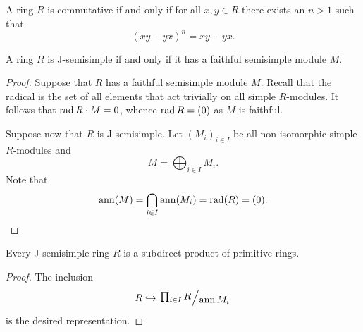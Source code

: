 \begin{izrek}
A ring $R$ is commutative if and only if for all $x, y \in R$
there exists an $n > 1$ such that
\[
(xy - yx)^n = xy - yx.
\]
\end{izrek}

\begin{trditev}
A ring $R$ is J-semisimple if and only if it has a faithful
semisimple module $M$.
\end{trditev}

\begin{proof}
Suppose that $R$ has a faithful semisimple module $M$. Recall that
the radical is the set of all elements that act trivially on all
simple $R$-modules. It follows that $\operatorname{rad} R \cdot M = 0$, whence
$\operatorname{rad} R = (0)$ as $M$ is faithful.

Suppose now that $R$ is J-semisimple. Let $(M_i)_{i \in I}$ be all
non-isomorphic simple $R$-modules and
\[
M = \bigoplus_{i \in I} M_i.
\]
Note that
\[
\operatorname{ann}(M) = \bigcap_{i \in I} \operatorname{ann}(M_i) = \operatorname{rad}(R) = (0). \qedhere
\]
\end{proof}

\begin{posledica}
Every J-semisimple ring $R$ is a subdirect product of primitive
rings.
\end{posledica}

\begin{proof}
The inclusion
\[
R \hookrightarrow \kvoc{\prod_{i \in I} R}{\ann M_i}
\]
is the desired representation.
\end{proof}
